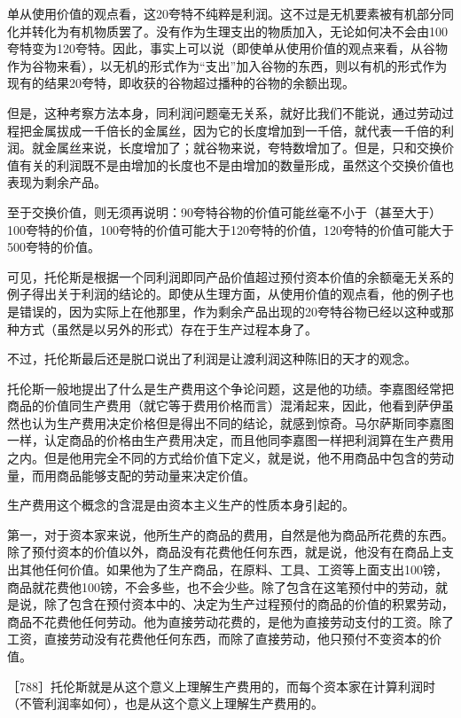 单从使用价值的观点看，这20夸特不纯粹是利润。这不过是无机要素被有机部分同化并转化为有机物质罢了。没有作为生理支出的物质加入，无论如何决不会由100夸特变为120夸特。因此，事实上可以说（即使单从使用价值的观点来看，从谷物作为谷物来看），以无机的形式作为“支出”加入谷物的东西，则以有机的形式作为现有的结果20夸特，即收获的谷物超过播种的谷物的余额出现。

但是，这种考察方法本身，同利润问题毫无关系，就好比我们不能说，通过劳动过程把金属拔成一千倍长的金属丝，因为它的长度增加到一千倍，就代表一千倍的利润。就金属丝来说，长度增加了；就谷物来说，夸特数增加了。但是，只和交换价值有关的利润既不是由增加的长度也不是由增加的数量形成，虽然这个交换价值也表现为剩余产品。

至于交换价值，则无须再说明：90夸特谷物的价值可能丝毫不小于（甚至大于）100夸特的价值，100夸特的价值可能大于120夸特的价值，120夸特的价值可能大于500夸特的价值。

可见，托伦斯是根据一个同利润即同产品价值超过预付资本价值的余额毫无关系的例子得出关于利润的结论的。即使从生理方面，从使用价值的观点看，他的例子也是错误的，因为实际上在他那里，作为剩余产品出现的20夸特谷物已经以这种或那种方式（虽然是以另外的形式）存在于生产过程本身了。

不过，托伦斯最后还是脱口说出了利润是让渡利润这种陈旧的天才的观念。


托伦斯一般地提出了什么是生产费用这个争论问题，这是他的功绩。李嘉图经常把商品的价值同生产费用（就它等于费用价格而言）混淆起来，因此，他看到萨伊虽然也认为生产费用决定价格但是得出不同的结论，就感到惊奇。马尔萨斯同李嘉图一样，认定商品的价格由生产费用决定，而且他同李嘉图一样把利润算在生产费用之内。但是他用完全不同的方式给价值下定义，就是说，他不用商品中包含的劳动量，而用商品能够支配的劳动量来决定价值。

生产费用这个概念的含混是由资本主义生产的性质本身引起的。

第一，对于资本家来说，他所生产的商品的费用，自然是他为商品所花费的东西。除了预付资本的价值以外，商品没有花费他任何东西，就是说，他没有在商品上支出其他任何价值。如果他为了生产商品，在原料、工具、工资等上面支出100镑，商品就花费他100镑，不会多些，也不会少些。除了包含在这笔预付中的劳动，就是说，除了包含在预付资本中的、决定为生产过程预付的商品的价值的积累劳动，商品不花费他任何劳动。他为直接劳动花费的，是他为直接劳动支付的工资。除了工资，直接劳动没有花费他任何东西，而除了直接劳动，他只预付不变资本的价值。

［788］托伦斯就是从这个意义上理解生产费用的，而每个资本家在计算利润时（不管利润率如何），也是从这个意义上理解生产费用的。

